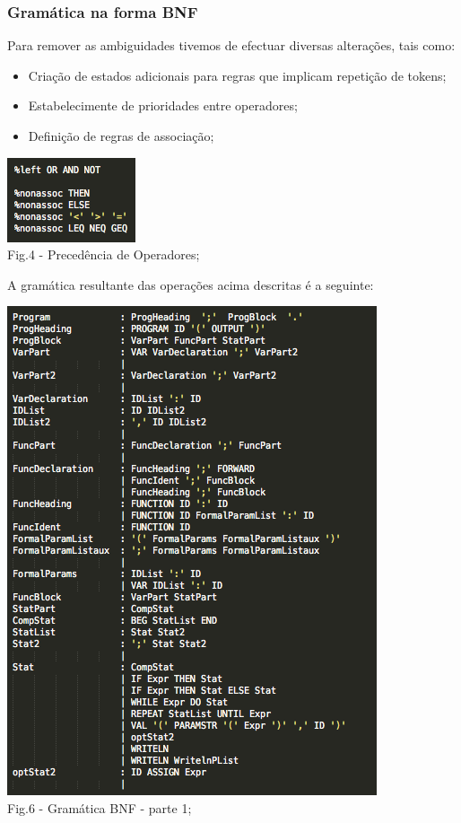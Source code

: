 \documentclass[12pt]{article}
\begin{document}
\subsubsection{Gramática na forma BNF}

\noindent Para remover as ambiguidades tivemos de efectuar diversas alterações, tais como:

\begin{itemize} 

\item Criação de estados adicionais para regras que implicam repetição de tokens;

\item Estabelecimente de prioridades entre operadores;

\item Definição de regras de associação;

\end{itemize}

\begin{center}
\includegraphics[scale=1]{operators_precedence.png}\\
Fig.4 - Precedência de Operadores;
\end{center}

\newpage

\indent A gramática resultante das operações acima descritas é a seguinte:

\begin{center}
\includegraphics[scale=1]{bnf_grammar_part1.png}\\
Fig.6 - Gramática BNF - parte 1;
\end{center}
\end{document}
